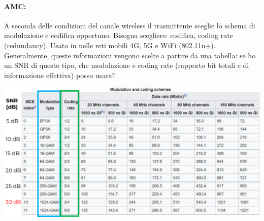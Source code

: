 \paragraph{AMC:} A seconda delle condizioni del canale wireless il trasmittente sceglie lo schema di modulazione e codifica opportuno. Bisogna scegliere: codifica, coding rate (redundancy). Usato in nelle reti mobili 4G, 5G e WiFi (802.11n+).\\

Generalmente, queste informazioni vengono scelte a partire da una tabella: se ho un SNR di questo tipo, che modulazione e coding rate (rapporto bit totali e di informazione effettiva) posso usare?  
\begin{center}
	\includegraphics[width=0.95\linewidth]{img/wireless/mcruppolo}
\end{center}

